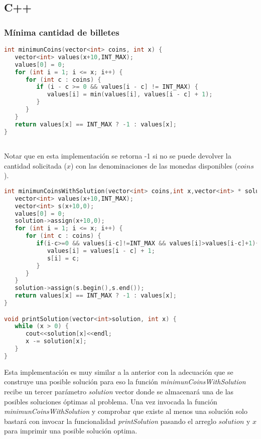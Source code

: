 \subsection{C++}

\subsubsection{Mínima cantidad de billetes}
\begin{lstlisting}[language=C++]
int minimunCoins(vector<int> coins, int x) {
   vector<int> values(x+10,INT_MAX);
   values[0] = 0;
   for (int i = 1; i <= x; i++) {
      for (int c : coins) {
         if (i - c >= 0 && values[i - c] != INT_MAX) {
            values[i] = min(values[i], values[i - c] + 1);
         }
      }
   }
   return values[x] == INT_MAX ? -1 : values[x];
}



\end{lstlisting}

Notar que en esta implementación se retorna -1 si no se puede devolver la cantidad solicitada ($x$) con las denominaciones de las monedas disponibles ($coins$).

\begin{lstlisting}[language=C++]
int minimunCoinsWithSolution(vector<int> coins,int x,vector<int> * solution){
   vector<int> values(x+10,INT_MAX);
   vector<int> s(x+10,0);
   values[0] = 0;
   solution->assign(x+10,0);
   for (int i = 1; i <= x; i++) {
      for (int c : coins) {
         if(i-c>=0 && values[i-c]!=INT_MAX && values[i]>values[i-c]+1){
            values[i] = values[i - c] + 1;
            s[i] = c;
         }
      }
   }
   solution->assign(s.begin(),s.end());
   return values[x] == INT_MAX ? -1 : values[x];
}

void printSolution(vector<int>solution, int x) {
   while (x > 0) {
      cout<<solution[x]<<endl;
      x -= solution[x];
   }
}
\end{lstlisting}

Esta implementación es muy similar a la anterior con la adecuación que se construye una posible solución para eso la función \emph{minimunCoinsWithSolution} recibe un tercer parámetro \emph{solution} vector donde se almacenará una de las posibles soluciones óptimas al problema. Una vez invocada la función \emph{minimunCoinsWithSolution} y comprobar que existe al menos una solución solo bastará con invocar la funcionalidad \emph{printSolution} pasando el arreglo $solution$ y $x$ para imprimir una posible solución optima.

